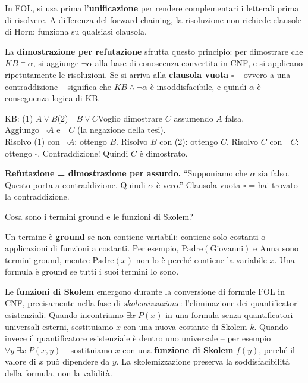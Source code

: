 \documentclass[12pt,a4paper]{article}
\begin{document}
In FOL, si usa prima l'\textbf{unificazione} per rendere complementari i letterali prima di risolvere. A differenza del forward chaining, la risoluzione non richiede clausole di Horn: funziona su qualsiasi clausola.

La \textbf{dimostrazione per refutazione} sfrutta questo principio: per dimostrare che $KB \models \alpha$, si aggiunge $\neg\alpha$ alla base di conoscenza convertita in CNF, e si applicano ripetutamente le risoluzioni. Se si arriva alla \textbf{clausola vuota} $\square$ -- ovvero a una contraddizione -- significa che $KB \land \neg\alpha$ è insoddisfacibile, e quindi $\alpha$ è conseguenza logica di KB.

\begin{esempiobox}
KB: (1) $A \lor B$\quad (2) $\neg B \lor C$\quad Voglio dimostrare $C$ assumendo $A$ falsa.\\
Aggiungo $\neg A$ e $\neg C$ (la negazione della tesi).\\
Risolvo (1) con $\neg A$: ottengo $B$. Risolvo $B$ con (2): ottengo $C$. Risolvo $C$ con $\neg C$: ottengo $\square$. Contraddizione! Quindi $C$ è dimostrato.
\end{esempiobox}

\begin{ricordabox}
\textbf{Refutazione = dimostrazione per assurdo.} ``Supponiamo che $\alpha$ sia falso. Questo porta a contraddizione. Quindi $\alpha$ è vero.'' Clausola vuota $\square$ = hai trovato la contraddizione.
\end{ricordabox}

\begin{domandabox}{Cosa sono i termini ground e le funzioni di Skolem?}
\end{domandabox}

Un termine è \textbf{ground} se non contiene variabili: contiene solo costanti o applicazioni di funzioni a costanti. Per esempio, $\text{Padre}(\text{Giovanni})$ e $\text{Anna}$ sono termini ground, mentre $\text{Padre}(x)$ non lo è perché contiene la variabile $x$. Una formula è ground se tutti i suoi termini lo sono.

Le \textbf{funzioni di Skolem} emergono durante la conversione di formule FOL in CNF, precisamente nella fase di \emph{skolemizzazione}: l'eliminazione dei quantificatori esistenziali. Quando incontriamo $\exists x\; P(x)$ in una formula senza quantificatori universali esterni, sostituiamo $x$ con una nuova costante di Skolem $k$. Quando invece il quantificatore esistenziale è dentro uno universale -- per esempio $\forall y\; \exists x\; P(x, y)$ -- sostituiamo $x$ con una \textbf{funzione di Skolem} $f(y)$, perché il valore di $x$ può dipendere da $y$. La skolemizzazione preserva la soddisfacibilità della formula, non la validità.
\end{document}
